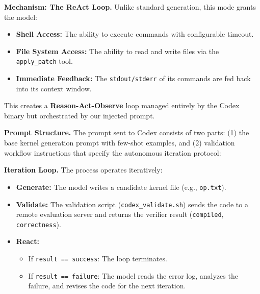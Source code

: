 \documentclass{article} %
\theoremstyle{definition}
\theoremstyle{remark}
\begin{document}
  \textbf{Mechanism: The ReAct Loop.}
  Unlike standard generation, this mode grants the model:
  \begin{itemize}
      \item \textbf{Shell Access:} The ability to execute commands with configurable timeout.
      \item \textbf{File System Access:} The ability to read and write files via the \texttt{apply\_patch} tool.
      \item \textbf{Immediate Feedback:} The \texttt{stdout/stderr} of its commands are fed back into its context window.
  \end{itemize}
  This creates a \textbf{Reason-Act-Observe} loop managed entirely by the Codex binary but orchestrated by our injected prompt.

  \textbf{Prompt Structure.}
  The prompt sent to Codex consists of two parts: (1) the base kernel generation prompt with few-shot examples, and (2) validation workflow instructions that specify the autonomous iteration protocol:

  \textbf{Iteration Loop.}
  The process operates iteratively:
  \begin{itemize}
      \item \textbf{Generate:} The model writes a candidate kernel file (e.g., \texttt{op.txt}).
      \item \textbf{Validate:} The validation script (\texttt{codex\_validate.sh}) sends the code to a remote evaluation server and returns the verifier result (\texttt{compiled}, \texttt{correctness}).
      \item \textbf{React:}
      \begin{itemize}
          \item If \texttt{result == success}: The loop terminates.
          \item If \texttt{result == failure}: The model reads the error log, analyzes the failure, and revises the code for the next iteration.
      \end{itemize}
  \end{itemize}
\end{document}
